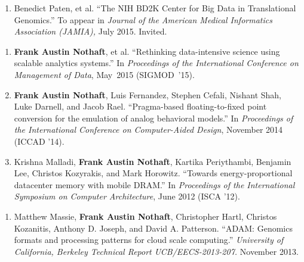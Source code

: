 \documentclass[10pt]{article} %
\begin{document}
\begin {minipage}[t]{0.2\linewidth}
\vspace{0pt}
\end {minipage}
\begin {minipage}[t]{0.8\linewidth}
\vspace{0pt}


\setdefaultleftmargin{13pt}{}{}{}{}{}
\begin{enumerate}
\item Benedict Paten, et al. ``The NIH BD2K Center for Big Data in Translational Genomics.''
To appear in \emph{Journal of the American Medical Informatics Association (JAMIA),} July 2015. Invited.
\end{enumerate}


\begin{enumerate}[resume]
\item {\textbf{Frank Austin Nothaft}, et al. ``Rethinking data-intensive science using scalable
analytics systems.'' In \emph{Proceedings of the International Conference on Management of
Data}, May~2015 (SIGMOD~'15).}
\item {\textbf{Frank Austin Nothaft}, Luis Fernandez, Stephen Cefali, Nishant Shah, Luke Darnell,
and Jacob Rael. ``Pragma-based floating-to-fixed point conversion for the emulation of analog
behavioral models.'' In \emph{Proceedings of the International Conference on Computer-Aided Design},
November 2014 (ICCAD '14).}
\item {Krishna Malladi, \textbf{Frank Austin Nothaft}, Kartika Periythambi, Benjamin Lee, 
Christos Kozyrakis, and Mark Horowitz. ``Towards energy-proportional datacenter memory with mobile DRAM.''
In \emph{Proceedings of the International Symposium on Computer Architecture}, June 2012 (ISCA '12).}
\end{enumerate}


\begin{enumerate}[resume]
\item {Matthew Massie, \textbf{Frank Austin Nothaft}, Christopher Hartl, Christos Kozanitis,
Anthony D. Joseph, and David A. Patterson. ``ADAM: Genomics formats and processing patterns
for cloud scale computing.'' \emph{University of California, Berkeley Technical Report
UCB/EECS-2013-207.} November 2013.}
\end{enumerate}


\end{minipage}
\end{document}

